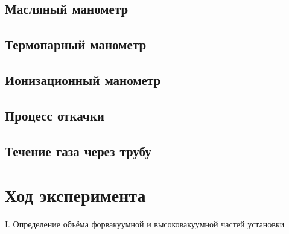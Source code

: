 \documentclass[a4paper,12pt]{article} %
\begin{document}
\subsection*{Масляный манометр}

\subsection*{Термопарный манометр}

\subsection*{Ионизационный манометр}

\subsection*{Процесс откачки}

\subsection*{Течение газа через трубу}

\section*{Ход эксперимента}

\begin{center}
  \textsf{I. Определение объёма форвакуумной и высоковакуумной частей установки}
\end{center}
\end{document}
